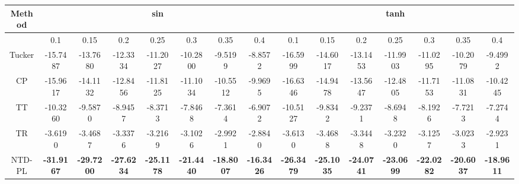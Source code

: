 \begin{tabular}{c|ccccccc|ccccccc}
    \hline
    Method & \multicolumn{7}{c|}{sin} & \multicolumn{7}{c}{tanh} \\
    \hline
     & 0.1 & 0.15 & 0.2 & 0.25 & 0.3 & 0.35 & 0.4 & 0.1 & 0.15 & 0.2 & 0.25 & 0.3 & 0.35 & 0.4 \\
    \hline
    Tucker & -15.7487 & -13.7680 & -12.3334 & -11.2027 & -10.2800 & -9.5199 & -8.8572 & -16.5999 & -14.6017 & -13.1453 & -11.9903 & -11.0295 & -10.2079 & -9.4992 \\
    CP & -15.9617 & -14.1132 & -12.8456 & -11.8125 & -11.1034 & -10.5512 & -9.9695 & -16.6346 & -14.9478 & -13.5647 & -12.4805 & -11.7153 & -11.0831 & -10.4245 \\
    TT & -10.3260 & -9.5870 & -8.9457 & -8.3713 & -7.8468 & -7.3614 & -6.9072 & -10.5127 & -9.8342 & -9.2371 & -8.6948 & -8.1926 & -7.7213 & -7.2744 \\
    TR & -3.6190 & -3.4687 & -3.3376 & -3.2169 & -3.1026 & -2.9921 & -2.8840 & -3.6130 & -3.4688 & -3.3448 & -3.2320 & -3.1257 & -3.0233 & -2.9231 \\
    \hline
    NTD-PL & \textbf{-31.9167} & \textbf{-29.7200} & \textbf{-27.6234} & \textbf{-25.1178} & \textbf{-21.4440} & \textbf{-18.8007} & \textbf{-16.3426} & \textbf{-26.3479} & \textbf{-25.1035} & \textbf{-24.0741} & \textbf{-23.0699} & \textbf{-22.0282} & \textbf{-20.6037} & \textbf{-18.9611} \\
    \hline
\end{tabular}
